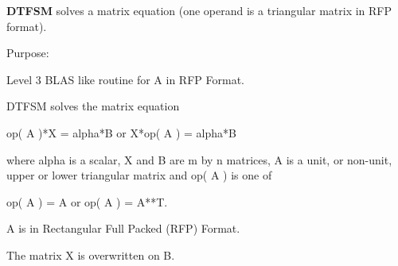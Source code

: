 {\bfseries D\+T\+F\+S\+M} solves a matrix equation (one operand is a triangular matrix in R\+F\+P format). 

 \begin{DoxyParagraph}{Purpose\+: }
\begin{DoxyVerb} Level 3 BLAS like routine for A in RFP Format.

 DTFSM  solves the matrix equation

    op( A )*X = alpha*B  or  X*op( A ) = alpha*B

 where alpha is a scalar, X and B are m by n matrices, A is a unit, or
 non-unit,  upper or lower triangular matrix  and  op( A )  is one  of

    op( A ) = A   or   op( A ) = A**T.

 A is in Rectangular Full Packed (RFP) Format.

 The matrix X is overwritten on B.\end{DoxyVerb}
 
\end{DoxyParagraph}

